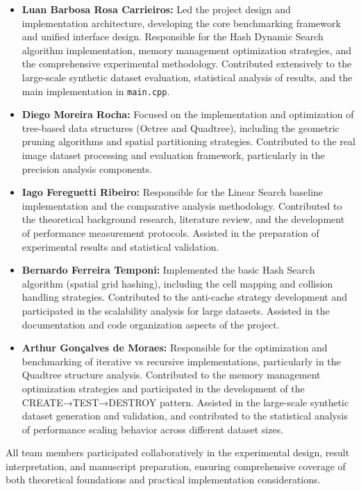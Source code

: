 \documentclass{sbc2023}
\begin{document}
\begin{itemize}
    \item \textbf{Luan Barbosa Rosa Carrieiros:} Led the project design and implementation architecture, developing the core benchmarking framework and unified interface design. Responsible for the Hash Dynamic Search algorithm implementation, memory management optimization strategies, and the comprehensive experimental methodology. Contributed extensively to the large-scale synthetic dataset evaluation, statistical analysis of results, and the main implementation in \texttt{main.cpp}.
    
    \item \textbf{Diego Moreira Rocha:} Focused on the implementation and optimization of tree-based data structures (Octree and Quadtree), including the geometric pruning algorithms and spatial partitioning strategies. Contributed to the real image dataset processing and evaluation framework, particularly in the precision analysis components.
    
    \item \textbf{Iago Fereguetti Ribeiro:} Responsible for the Linear Search baseline implementation and the comparative analysis methodology. Contributed to the theoretical background research, literature review, and the development of performance measurement protocols. Assisted in the preparation of experimental results and statistical validation.
    
    \item \textbf{Bernardo Ferreira Temponi:} Implemented the basic Hash Search algorithm (spatial grid hashing), including the cell mapping and collision handling strategies. Contributed to the anti-cache strategy development and participated in the scalability analysis for large datasets. Assisted in the documentation and code organization aspects of the project.
    
    \item \textbf{Arthur Gonçalves de Moraes:} Responsible for the optimization and benchmarking of iterative vs recursive implementations, particularly in the Quadtree structure analysis. Contributed to the memory management optimization strategies and participated in the development of the CREATE→TEST→DESTROY pattern. Assisted in the large-scale synthetic dataset generation and validation, and contributed to the statistical analysis of performance scaling behavior across different dataset sizes.
\end{itemize}

All team members participated collaboratively in the experimental design, result interpretation, and manuscript preparation, ensuring comprehensive coverage of both theoretical foundations and practical implementation considerations.
\end{document}
